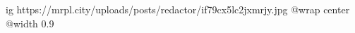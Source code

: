  
 
 
 
 

\ifcmt
  ig https://mrpl.city/uploads/posts/redactor/if79cx5lc2jxmrjy.jpg
  @wrap center
  @width 0.9
\fi
